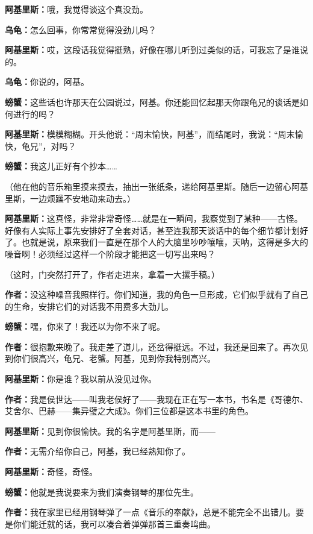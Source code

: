 \documentclass[
  12pt,
  twoside,
  openright,
  oldfontcommands,
]{memoir}
\newcommand{\dialogname}[1]{{\sffamily\bfseries #1}}
\begin{document}
\dialogname{阿基里斯：}哦，我觉得谈这个真没劲。

\dialogname{乌龟：}怎么回事，你常常觉得没劲儿吗？

\dialogname{阿基里斯：}哎，这段话我觉得挺熟，好像在哪儿听到过类似的话，可我忘了是谁说的。

\dialogname{乌龟：}你说的，阿基。

\dialogname{螃蟹：}这些话也许那天在公园说过，阿基。你还能回忆起那天你跟龟兄的谈话是如何进行的吗？

\dialogname{阿基里斯：}模模糊糊。开头他说：``周末愉快，阿基''，而结尾时，我说：``周末愉快，龟兄''，对吗？

\dialogname{螃蟹：}我这儿正好有个抄本\ldots\ldots{}

（他在他的音乐箱里摸来摸去，抽出一张纸条，递给阿基里斯。随后一边留心阿基里斯，一边烦躁不安地动来动去。）

\dialogname{阿基里斯：}这真怪，非常非常奇怪\ldots\ldots 就是在一瞬间，我察觉到了某种------古怪。好像有人实际上事先安排好了全套对话，甚至连我那天谈话中的每个细节都计划好了。也就是说，原来我们一直是在那个人的大脑里吵吵嚷嚷，天呐，这得是多大的噪音啊！必须经过这样一个阶段才能把这一切写出来吗？

（这时，门突然打开了，作者走进来，拿着一大摞手稿。）

\dialogname{作者：}没这种噪音我照样行。你们知道，我的角色一旦形成，它们似乎就有了自己的生命，安排它们的对话我不用费多大劲儿。

\dialogname{螃蟹：}嘿，你来了！我还以为你不来了呢。

\dialogname{作者：}很抱歉来晚了。我走差了道儿，还岔得挺远。不过，我还是回来了。再次见到你们很高兴，龟兄、老蟹。阿基，见到你我特别高兴。

\dialogname{阿基里斯：}你是谁？我以前从没见过你。

\dialogname{作者：}我是侯世达------叫我老侯好了------我现在正在写一本书，书名是《哥德尔、艾舍尔、巴赫------集异璧之大成》。你们三位都是这本书里的角色。

\dialogname{阿基里斯：}见到你很愉快。我的名字是阿基里斯，而------

\dialogname{作者：}无需介绍你自己，阿基，我已经熟知你了。

\dialogname{阿基里斯：}奇怪，奇怪。

\dialogname{螃蟹：}他就是我说要来为我们演奏钢琴的那位先生。

\dialogname{作者：}我在家里已经用钢琴弹了一点《音乐的奉献》，总是不能完全不出错儿。要是你们能迁就的话，我可以凑合着弹弹那首三重奏鸣曲。
\end{document}
